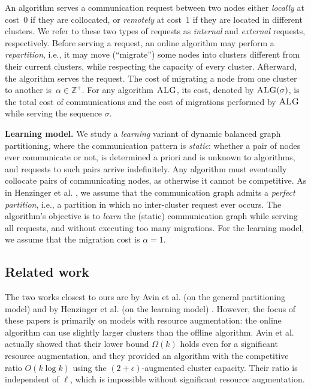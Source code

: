 \documentclass[a4paper,anonymous,USenglish]{lipics-v2019}
\newcommand{\ALG}{\textsc{ALG}\xspace}
\begin{document}
An algorithm serves a communication request between two nodes
either \emph{locally} at cost~0
if they are collocated,
or \emph{remotely} at cost~1
if they are located in different clusters.
We refer to these two types of requests as \emph{internal}
and \emph{external} requests, respectively.
Before serving a request,
an online algorithm may perform a \emph{repartition},
i.e.,
it may move (``migrate'') some nodes into clusters different from their current clusters, while respecting the capacity of every cluster. 
Afterward, 
the algorithm serves the  request.
The cost of migrating a node from one cluster to another
is~$\alpha \in \mathbb{Z}^+$.
For any algorithm $\ALG$,
its cost,
denoted by $\ALG(\sigma)$,
is the total cost of communications and
the cost of migrations performed by $\ALG$ while serving the sequence $\sigma$.



\noindent
\textbf{Learning model.}
We study a \emph{learning} variant of dynamic balanced graph partitioning,
where the communication pattern is \emph{static}:
whether a pair of  nodes ever communicate or not, 
is determined a priori and is unknown to algorithms,
 and requests to such pairs arrive indefinitely.
Any algorithm must eventually collocate  pairs of communicating nodes,
as otherwise it cannot be competitive.
As in Henzinger et al. \cite{sigmetrics19_partitioning}, we assume that the communication graph admits a \emph{perfect partition},
i.e., a partition in which no inter-cluster request ever occurs.
The algorithm's objective is to \emph{learn} the (static) communication graph
 while serving all requests,
and without executing too many migrations.
For the learning model, we  assume that the migration cost is $\alpha=1$.


\subsection{Related work}

The two works closest to ours are by Avin et al. (on the general partitioning model) \cite{repartition-disc, sidma-arxiv} and by Henzinger et al. (on the learning model) \cite{sigmetrics19_partitioning}.
However, the focus of these papers is primarily on models with resource augmentation: the online algorithm can use slightly larger clusters than the offline algorithm.  
Avin et al. actually showed that their lower bound $\Omega(k)$ holds even for a significant resource augmentation, and they provided an algorithm with the competitive ratio $O(k \log k)$ using the $(2+\epsilon)$-augmented cluster capacity.
Their ratio is independent of $\ell$, which is impossible without significant resource augmentation.
\end{document}
